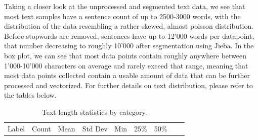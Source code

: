\documentclass[
  titlepage]{article}
\begin{document}
Taking a closer look at the unprocessed and segmented text data, we see
that most text samples have a sentence count of up to 2500-3000 words,
with the distribution of the data resembling a rather skewed, almost
poisson distribution. Before stopwords are removed, sentences have up to
12'000 words per datapoint, that number decreasing to roughly 10'000
after segmentation using Jieba. In the box plot, we can see that most
data points contain roughly anywhere between 1'000-10'000 characters on
average and rarely exceed that range, meaning that most data points
collected contain a usable amount of data that can be further processed
and vectorized. For further details on text distribution, please refer
to the tables below.

\begin{longtable}[]{@{}
  >{\raggedright\arraybackslash}p{}
  >{\raggedright\arraybackslash}p{}
  >{\raggedright\arraybackslash}p{}
  >{\raggedright\arraybackslash}p{}
  >{\raggedright\arraybackslash}p{}
  >{\raggedright\arraybackslash}p{}
  >{\raggedright\arraybackslash}p{}
  >{\raggedright\arraybackslash}p{}
  >{\raggedright\arraybackslash}p{}@{}}
\caption{Text length statistics by category.}\tabularnewline
\toprule\noalign{}
\begin{minipage}[b]{\linewidth}\raggedright
Label
\end{minipage} & \begin{minipage}[b]{\linewidth}\raggedright
Count
\end{minipage} & \begin{minipage}[b]{\linewidth}\raggedright
Mean
\end{minipage} & \begin{minipage}[b]{\linewidth}\raggedright
Std Dev
\end{minipage} & \begin{minipage}[b]{\linewidth}\raggedright
Min
\end{minipage} & \begin{minipage}[b]{\linewidth}\raggedright
25\%
\end{minipage} & \begin{minipage}[b]{\linewidth}\raggedright
50\%
\end{minipage} & \begin{minipage}[b]{\linewidth}\raggedright

\end{minipage}
\end{longtable}
\end{document}

